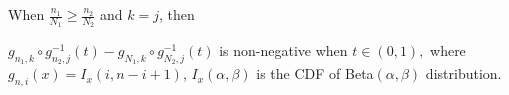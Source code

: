 \documentclass[12pt]{article}
\begin{document}


When $\frac{n_1}{N_1} \geq \frac{n_2}{N_2}$ and $k = j$, then 

$g_{n_1, k} \circ g_{n_2, j}^{-1}(t) - g_{N_1, k} \circ g_{N_2, j}^{-1}(t)$ is non-negative when $t \in (0,1),$ where $g_{n,i}(x) = I_x(i, n-i+1)$, $I_x(\alpha, \beta)$ is the CDF of Beta$(\alpha, \beta)$ distribution. 






\end{document}
